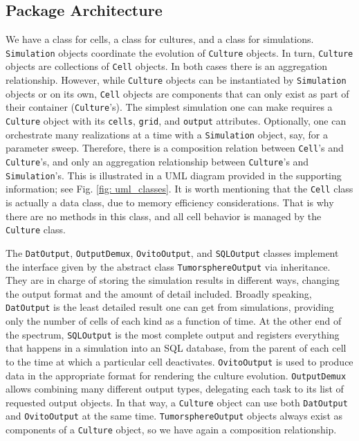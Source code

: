 \documentclass[10pt,letterpaper]{article}
\begin{document}
\subsection*{Package Architecture}
We have a class for cells, a class for cultures, and a class for simulations. \lstinline|Simulation| objects coordinate the evolution of \lstinline|Culture| objects. In turn, \lstinline|Culture| objects are collections of \lstinline|Cell| objects. In both cases there is an aggregation relationship. However, while \lstinline|Culture| objects can be instantiated by \lstinline|Simulation| objects or on its own, \lstinline|Cell| objects are components that can only exist as part of their container (\lstinline|Culture|'s). The simplest simulation one can make requires a \lstinline|Culture| object with its \lstinline|cells|, \lstinline|grid|, and \lstinline|output| attributes. Optionally, one can orchestrate many realizations at a time with a \lstinline|Simulation| object, say, for a parameter sweep. Therefore, there is a composition relation between \lstinline|Cell|'s and \lstinline|Culture|'s, and only an aggregation relationship between \lstinline|Culture|'s and \lstinline|Simulation|'s. This is illustrated in a UML diagram provided in the supporting information; see Fig. \ref{fig: uml_classes}. It is worth mentioning that the \lstinline|Cell| class is actually a data class, due to memory efficiency considerations. That is why there are no methods in this class, and all cell behavior is managed by the \lstinline|Culture| class.

The \lstinline|DatOutput|, \lstinline|OutputDemux|, \lstinline|OvitoOutput|, and \lstinline|SQLOutput| classes implement the interface given by the abstract class \lstinline|TumorsphereOutput| via inheritance. They are in charge of storing the simulation results in different ways, changing the output format and the amount of detail included. Broadly speaking, \lstinline|DatOutput| is the least detailed result one can get from simulations, providing only the number of cells of each kind as a function of time. At the other end of the spectrum, \lstinline|SQLOutput| is the most complete output and registers everything that happens in a simulation into an SQL database, from the parent of each cell to the time at which a particular cell deactivates. \lstinline|OvitoOutput| is used to produce data in the appropriate format for rendering the culture evolution. \lstinline|OutputDemux| allows combining many different output types, delegating each task to its list of requested output objects. In that way, a \lstinline|Culture| object can use both \lstinline|DatOutput| and \lstinline|OvitoOutput| at the same time. \lstinline|TumorsphereOutput| objects always exist as components of a \lstinline|Culture| object, so we have again a composition relationship.
\end{document}
